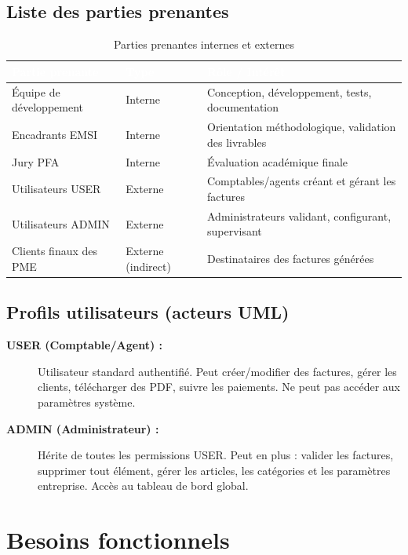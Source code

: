 \documentclass[12pt,a4paper]{report}
\begin{document}
\subsection{Liste des parties prenantes}

\begin{table}[H]
\centering
\caption{Parties prenantes internes et externes}
\label{tab:parties_prenantes}
\begin{tabularx}{\textwidth}{|l|l|X|}
\hline
\rowcolor{emsiblue}\textcolor{white}{\textbf{Partie prenante}} & \textcolor{white}{\textbf{Type}} & \textcolor{white}{\textbf{Rôle / Intérêt}} \\
\hline
Équipe de développement & Interne & Conception, développement, tests, documentation \\
Encadrants EMSI & Interne & Orientation méthodologique, validation des livrables \\
Jury PFA & Interne & Évaluation académique finale \\
Utilisateurs USER & Externe & Comptables/agents créant et gérant les factures \\
Utilisateurs ADMIN & Externe & Administrateurs validant, configurant, supervisant \\
Clients finaux des PME & Externe (indirect) & Destinataires des factures générées \\
\hline
\end{tabularx}
\end{table}

\subsection{Profils utilisateurs (acteurs UML)}

\begin{description}
    \item[\textbf{USER (Comptable/Agent) :}] Utilisateur standard authentifié. Peut créer/modifier des factures, gérer les clients, télécharger des PDF, suivre les paiements. Ne peut pas accéder aux paramètres système.
    \item[\textbf{ADMIN (Administrateur) :}] Hérite de toutes les permissions USER. Peut en plus : valider les factures, supprimer tout élément, gérer les articles, les catégories et les paramètres entreprise. Accès au tableau de bord global.
\end{description}

\section{Besoins fonctionnels}
\end{document}
